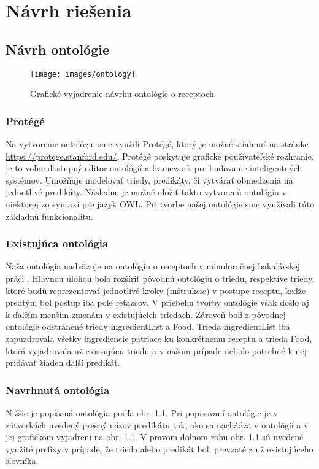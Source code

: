 \chapter{Návrh riešenia}
\label{kap:navrh} %


\section{Návrh ontológie}

\begin{figure}[h]
\texttt{[image: images/ontology]}
\caption{Grafické vyjadrenie návrhu ontológie o receptoch}
\label{ontology}
\end{figure}

\subsection{Protégé}
Na vytvorenie ontológie sme využili Protégé, ktorý je možné stiahnuť na stránke \href{https://protege.stanford.edu/}{https://protege.stanford.edu/}. Protégé poskytuje grafické používateľské rozhranie, je to voľne dostupný editor ontológií a framework pre budovanie inteligentných systémov. Umožňuje modelovať triedy, predikáty, či vytvárať obmedzenia na jednotlivé predikáty. Následne je možné uložiť takto vytvorenú ontológiu v niektorej zo syntaxí pre jazyk OWL. Pri tvorbe našej ontológie sme využívali túto základnú funkcionalitu.

\subsection{Existujúca ontológia}
	Naša ontológia nadväzuje na ontológiu o receptoch v minuloročnej bakalárskej práci \cite{bakalarka}. Hlavnou úlohou bolo rozšíriť pôvodnú ontológiu o triedu, respektíve triedy, ktoré budú reprezentovať jednotlivé kroky (inštrukcie) v postupe receptu, keďže predtým bol postup iba pole reťazcov. V priebehu tvorby ontológie však došlo aj k ďalším menším zmenám v existujúcich triedach. Zároveň boli z pôvodnej ontológie odstránené triedy ingredientList a Food. Trieda ingredientList iba zapuzdrovala všetky ingrediencie patriace ku konkrétnemu receptu a trieda Food, ktorá vyjadrovala už existujúcu triedu a v našom prípade nebolo potrebné k nej pridávať žiaden ďalší predikát.
	
\subsection{Navrhnutá ontológia}
Nižšie je popísaná ontológia podľa obr. \ref{ontology}. Pri popisovaní ontológie je v zátvorkách uvedený presný názov predikátu tak, ako sa nachádza v ontológií a v jej grafickom vyjadrení na obr. \ref{ontology}. V pravom dolnom rohu obr. \ref{ontology} sú uvedené využité prefixy v prípade, že trieda alebo predikát boli prevzaté z už existujúceho slovníka. 
	
